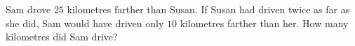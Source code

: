 Sam drove $25$ kilometres farther than Susan. If Susan had driven twice as far as she did, Sam would have driven only $10$ kilometres farther than her. How many kilometres did Sam drive?
